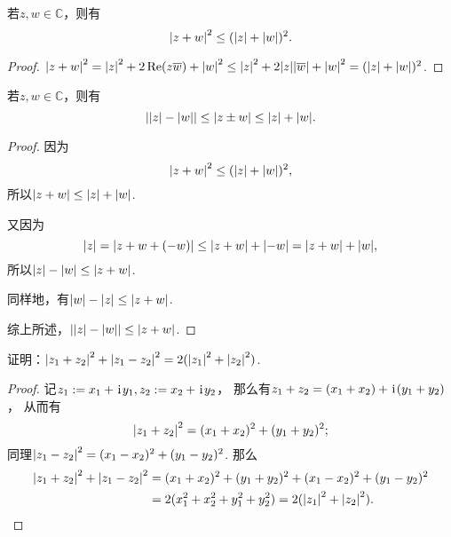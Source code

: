 \begin{theorem}
若\(z,w \in \mathbb{C}\)，则有\begin{equation}
	\abs{z + w}^2 \leq (\abs{z} + \abs{w})^2.
\end{equation}
\begin{proof}
\(
	\abs{z + w}^2
	= \abs{z}^2 + 2 \Re(z \overline{w}) + \abs{w}^2
	\leq \abs{z}^2 + 2 \abs{z}\abs{\overline{w}} + \abs{w}^2
	= (\abs{z} + \abs{w})^2
\).
\end{proof}
\end{theorem}

\begin{theorem}[三角不等式]
若\(z,w \in \mathbb{C}\)，则有\begin{equation}
	\abs{\abs{z}-\abs{w}} \leq \abs{z \pm w} \leq \abs{z} + \abs{w}.
\end{equation}
\begin{proof}
因为\begin{equation*}
	\abs{z + w}^2 \leq (\abs{z} + \abs{w})^2,
\end{equation*}
所以\(\abs{z + w} \leq \abs{z} + \abs{w}\).

又因为\begin{equation*}
	\abs{z}
	= \abs{z + w + (-w)} \leq \abs{z+w} + \abs{-w}
	= \abs{z+w} + \abs{w},
\end{equation*}
所以\(\abs{z}-\abs{w} \leq \abs{z+w}\).

同样地，有\(\abs{w}-\abs{z} \leq \abs{z+w}\).

综上所述，\(\abs{\abs{z}-\abs{w}}\leq\abs{z+w}\).
\end{proof}
\end{theorem}

\begin{example}
证明：\(\abs{z_1+z_2}^2 + \abs{z_1-z_2}^2 = 2 (\abs{z_1}^2 + \abs{z_2}^2)\).
\begin{proof}
记\(
	z_1 := x_1 + \kern1pt\mathrm{i}\kern1pt y_1,
	z_2 := x_2 + \kern1pt\mathrm{i}\kern1pt y_2
\)，
那么有\(z_1+z_2 = (x_1+x_2) + \kern1pt\mathrm{i}\kern1pt(y_1+y_2)\)，
从而有\begin{equation*}
	\abs{z_1+z_2}^2 = (x_1+x_2)^2 + (y_1+y_2)^2;
\end{equation*}
同理\(\abs{z_1-z_2}^2 = (x_1-x_2)^2 + (y_1-y_2)^2\).
那么\begin{align*}
	\abs{z_1+z_2}^2 + \abs{z_1-z_2}^2
	&= (x_1+x_2)^2 + (y_1+y_2)^2
	+ (x_1-x_2)^2 + (y_1-y_2)^2 \\
	&= 2 ( x_1^2 + x_2^2 + y_1^2 + y_2^2 )
	= 2 ( \abs{z_1}^2 + \abs{z_2}^2 ).
	\qedhere
\end{align*}
\end{proof}
\end{example}

